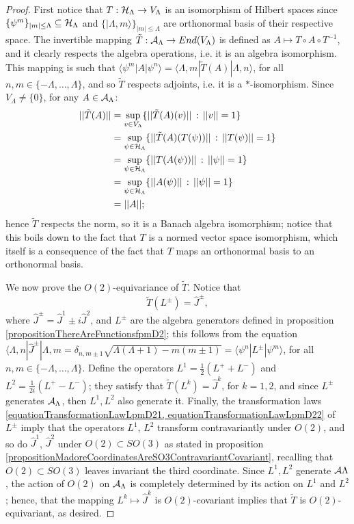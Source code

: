 \begin{proof}
First notice that $T: \mathcal H_\Lambda \to V_\Lambda$ is an isomorphism of Hilbert spaces since $\{\psi^m\}_{|m| \leq \Lambda} \subseteq \mathcal H_\Lambda$ and $\{|\Lambda, m\rangle\}_{|m| \leq \Lambda}$ are orthonormal basis of their respective space. The invertible mapping $\tilde T: \mathcal A_\Lambda \to End(V_\Lambda)$ is defined as $A \mapsto T \circ A \circ T^{-1}$, and it clearly respects the algebra operations, i.e. it is an algebra isomorphism. This mapping is such that $\langle 
\psi^m | A | \psi^n \rangle = \langle \Lambda, m | \tilde T(A) | \Lambda, n\rangle$, for all $n, m \in \{-\Lambda, \dots, \Lambda\}$, and so $\tilde T$ respects adjoints, i.e. it is a $*$-isomorphism. Since $V_\Lambda \neq \{0\}$, for any $A \in \mathcal A_\Lambda$:
\begin{align*}
    ||\tilde T (A)|| &= \sup_{v \in V_\Lambda} \{||\tilde T(A)(v)||\,:\, ||v|| = 1\} \\
    &= \sup_{\psi \in \mathcal H_\Lambda} \{||\tilde T(A)(T(\psi))||\,:\, ||T(\psi)|| = 1\} \\
    &= \sup_{\psi \in \mathcal H_\Lambda} \{||T(A(\psi))||\,:\, ||\psi|| = 1\} \\
    &= \sup_{\psi \in \mathcal H_\Lambda} \{||A(\psi)||\,:\, ||\psi|| = 1\}\\
    &= ||A||;
\end{align*}
hence $\tilde T$ respects the norm, so it is a Banach algebra isomorphism; notice that this boils down to the fact that $T$ is a normed vector space isomorphism, which itself is a consequence of the fact that $T$ maps an orthonormal basis to an orthonormal basis.

We now prove the $O(2)$-equivariance of $\tilde T$. Notice that 
\begin{equation}
    \tilde T(L^\pm) = \hat J^\pm,
\end{equation}
where $\hat J^\pm = \hat J^1 \pm i \hat J^2$, and $L^\pm$ are the algebra generators defined in proposition \ref{propositionThereAreFunctionsfpmD2}; this follows from the equation $\langle \Lambda, n| \hat J^\pm |\Lambda, m = \delta_{n, m \pm 1} \sqrt{\Lambda(\Lambda + 1) - m(m \pm 1)} = \langle \psi^n | L^\pm | \psi^m \rangle$, for all $n, m \in \{-\Lambda, \dots, \Lambda\}$. Define the operators $L^1 = \frac{1}{2}(L^+ + L^-)$ and $L^2 = \frac{1}{2i}(L^+ - L^-)$; they satisfy that $\tilde T(L^k) = \hat J^k$, for $k = 1, 2$, and since $L^\pm$ generates $\mathcal A_\Lambda$, then $L^1, L^2$ also generate it. Finally, the transformation laws \eqref{equationTransformationLawLpmD21, equationTransformationLawLpmD22} of $L^\pm$ imply that the operators $L^1$, $L^2$ transform contravariantly under $O(2)$, and so do $\hat J^1$, $\hat J^2$ under $O(2) \subset SO(3)$ as stated in proposition \ref{propositionMadoreCoordinatesAreSO3ContravariantCovariant}, recalling that $O(2) \subset SO(3)$ leaves invariant the third coordinate. Since $L^1, L^2$ generate $\mathcal A\Lambda$, the action of $O(2)$ on $\mathcal A_\Lambda$ is completely determined by its action on $L^1$ and $L^2$; hence, that the mapping $L^k \mapsto \hat J^k$ is $O(2)$-covariant implies that $\tilde T$ is $O(2)$-equivariant, as desired.


\end{proof}
